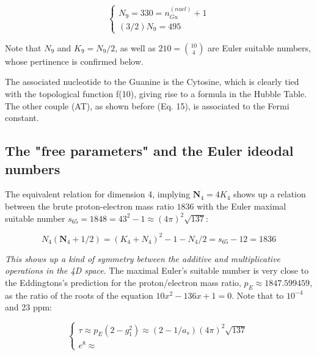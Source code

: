 \documentclass[a4paper,9pt]{article}
\begin{document}
\begin{equation}
 \left\{
    \begin{array}{ll} 
            N_9 = 330 = n_{Gu}^{(nucl)} + 1\\
            (3/2)N_9 = 495 
    \end{array}
\right.
\end{equation}


Note that $N_9$ and $K_9 = N_9/2$, as well as $210 = \binom{10}{4}$ are Euler suitable numbers, whose pertinence is confirmed below.

The associated nucleotide to the Guanine is the Cytosine, which is clearly tied with the topological function f(10), giving rise to a formula in the Hubble Table. The other couple (AT), as shown before (Eq. 15), is associated to the Fermi constant.

 



\subsection{The "free parameters" and the Euler ideodal numbers} 

The equivalent relation for dimension 4, implying $\textbf{N}_4 = 4 K_4$ shows up a relation between the brute proton-electron mass ratio $1836$ with the Euler maximal suitable number $s_{65} = 1848 = 43^2 -1 \approx (4\pi)^2\sqrt {137}$:

\begin{equation}
 N_4(\textbf{N}_4 + 1/2) = (K_4 + N_4)^2 - 1 - N_4/2 = s_{65} - 12 = 1836
 \end{equation}

\textit{This shows up a kind of symmetry between the additive and multiplicative operations in the 4D space}. The maximal Euler's suitable number is very close to the Eddingtons's prediction \cite{Eddington} for the proton/electron mass ratio, $p_E \approx 1847.599459$, as the ratio of the roots of the equation $10x^2 - 136 x + 1 = 0$. Note that to $10^{-4}$ and 23 ppm:

\begin{equation}
 \left\{
    \begin{array}{ll} 
           \tau \approx p_E(2-g_1^2) \approx (2-1/a_s)(4\pi)^2\sqrt {137}\\
            e^8 \approx  
    \end{array}
\right.
\end{equation}
 
\end{document}
